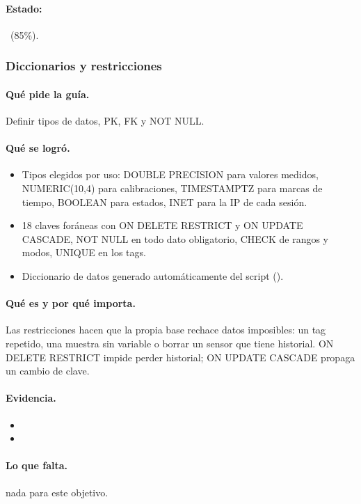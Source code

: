 \documentclass[a4paper,11pt]{article}
\begin{document}
\paragraph{Estado:} \parcial~(85\%).
\subsubsection{Diccionarios y restricciones}
\paragraph{Qué pide la guía.} Definir tipos de datos, PK, FK y NOT NULL.
\paragraph{Qué se logró.}
\begin{itemize}
\item Tipos elegidos por uso: DOUBLE PRECISION para valores medidos, NUMERIC(10,4) para calibraciones, TIMESTAMPTZ para marcas de tiempo, BOOLEAN para estados, INET para la IP de cada sesión.
\item 18 claves foráneas con ON DELETE RESTRICT y ON UPDATE CASCADE, NOT NULL en todo dato obligatorio, CHECK de rangos y modos, UNIQUE en los tags.
\item Diccionario de datos generado automáticamente del script ().
\end{itemize}
\paragraph{Qué es y por qué importa.} Las restricciones hacen que la propia base rechace datos imposibles: un tag repetido, una muestra sin variable o borrar un sensor que tiene historial. ON DELETE RESTRICT impide perder historial; ON UPDATE CASCADE propaga un cambio de clave.
\paragraph{Evidencia.}
\begin{itemize}\small
\item {}
\item {}
\end{itemize}
\paragraph{Lo que falta.} nada para este objetivo.
\end{document}
